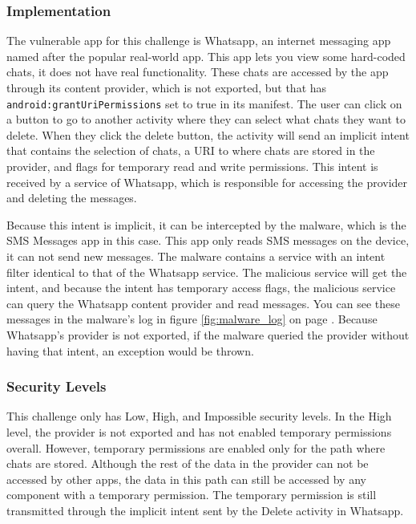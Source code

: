     \subsubsection{Implementation}
        \label{subsubsec:provider_uri_hijack_implementation}
        
    The vulnerable app for this challenge is Whatsapp, an internet messaging app named after the popular real-world app. This app lets you view some hard-coded chats, it does not have real functionality. These chats are accessed by the app through its content provider, which is not exported, but that has \lstinline|android:grantUriPermissions| set to true in its manifest. The user can click on a button to go to another activity where they can select what chats they want to delete. When they click the delete button, the activity will send an implicit intent that contains the selection of chats, a URI to where chats are stored in the provider, and flags for temporary read and write permissions. This intent is received by a service of Whatsapp, which is responsible for accessing the provider and deleting the messages.
    
    Because this intent is implicit, it can be intercepted by the malware, which is the SMS Messages app in this case. This app only reads SMS messages on the device, it can not send new messages. The malware contains a service with an intent filter identical to that of the Whatsapp service. The malicious service will get the intent, and because the intent has temporary access flags, the malicious service can query the Whatsapp content provider and read messages. You can see these messages in the malware's log in figure \ref{fig:malware_log} on page \pageref{fig:malware_log}. Because Whatsapp's provider is not exported, if the malware queried the provider without having that intent, an exception would be thrown.
    
    \subsubsection{Security Levels}
        \label{subsubsec:provider_uri_hijack_security_levels}
        
    This challenge only has Low, High, and Impossible security levels. In the High level, the provider is not exported and has not enabled temporary permissions overall. However, temporary permissions are enabled only for the path where chats are stored. Although the rest of the data in the provider can not be accessed by other apps, the data in this path can still be accessed by any component with a temporary permission. The temporary permission is still transmitted through the implicit intent sent by the Delete activity in Whatsapp.
    
